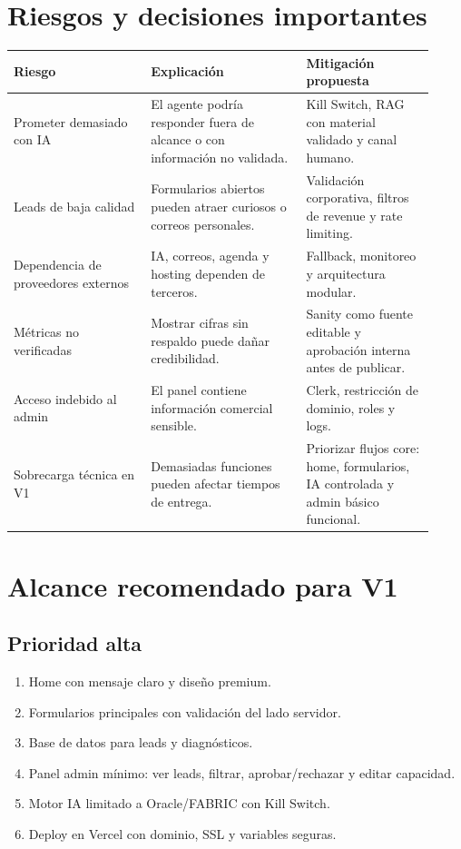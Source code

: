 \documentclass[11pt,letterpaper]{article}
\begin{document}
\section{Riesgos y decisiones importantes}

\begin{longtable}{p{0.30\linewidth}p{0.34\linewidth}p{0.28\linewidth}}
\toprule
\textbf{Riesgo} & \textbf{Explicaci\'on} & \textbf{Mitigaci\'on propuesta} \\
\midrule
Prometer demasiado con IA & El agente podr\'ia responder fuera de alcance o con informaci\'on no validada. & Kill Switch, RAG con material validado y canal humano. \\
Leads de baja calidad & Formularios abiertos pueden atraer curiosos o correos personales. & Validaci\'on corporativa, filtros de revenue y rate limiting. \\
Dependencia de proveedores externos & IA, correos, agenda y hosting dependen de terceros. & Fallback, monitoreo y arquitectura modular. \\
M\'etricas no verificadas & Mostrar cifras sin respaldo puede da\~nar credibilidad. & Sanity como fuente editable y aprobaci\'on interna antes de publicar. \\
Acceso indebido al admin & El panel contiene informaci\'on comercial sensible. & Clerk, restricci\'on de dominio, roles y logs. \\
Sobrecarga t\'ecnica en V1 & Demasiadas funciones pueden afectar tiempos de entrega. & Priorizar flujos core: home, formularios, IA controlada y admin b\'asico funcional. \\
\bottomrule
\end{longtable}

\section{Alcance recomendado para V1}

\subsection{Prioridad alta}

\begin{enumerate}
\item Home con mensaje claro y dise\~no premium.
\item Formularios principales con validaci\'on del lado servidor.
\item Base de datos para leads y diagn\'osticos.
\item Panel admin m\'inimo: ver leads, filtrar, aprobar/rechazar y editar capacidad.
\item Motor IA limitado a Oracle/FABRIC con Kill Switch.
\item Deploy en Vercel con dominio, SSL y variables seguras.
\end{enumerate}
\end{document}
